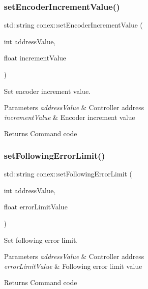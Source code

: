 \subsubsection{\texorpdfstring{set\+Encoder\+Increment\+Value()}{setEncoderIncrementValue()}}
{\footnotesize\ttfamily std\+::string conex\+::set\+Encoder\+Increment\+Value (\begin{DoxyParamCaption}\item[{int}]{address\+Value,  }\item[{float}]{increment\+Value }\end{DoxyParamCaption})}



Set encoder increment value. 


\begin{DoxyParams}{Parameters}
{\em address\+Value} & Controller address \\
\hline
{\em increment\+Value} & Encoder increment value \\
\hline
\end{DoxyParams}
\begin{DoxyReturn}{Returns}
Command code 
\end{DoxyReturn}
\mbox{\label{namespaceconex_aecd28d691655d6fa73f28b2dd5922f8e}} 
\subsubsection{\texorpdfstring{set\+Following\+Error\+Limit()}{setFollowingErrorLimit()}}
{\footnotesize\ttfamily std\+::string conex\+::set\+Following\+Error\+Limit (\begin{DoxyParamCaption}\item[{int}]{address\+Value,  }\item[{float}]{error\+Limit\+Value }\end{DoxyParamCaption})}



Set following error limit. 


\begin{DoxyParams}{Parameters}
{\em address\+Value} & Controller address \\
\hline
{\em error\+Limit\+Value} & Following error limit value \\
\hline
\end{DoxyParams}
\begin{DoxyReturn}{Returns}
Command code 
\end{DoxyReturn}
\mbox{\label{namespaceconex_a45b737635000384b926ab6e2bd829865}} 
